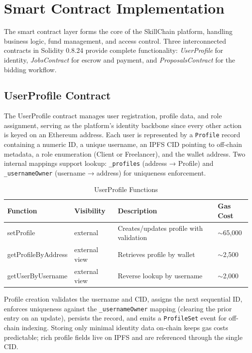 \section{Smart Contract Implementation}

The smart contract layer forms the core of the SkillChain platform, handling business logic, fund management, and access control. Three interconnected contracts in Solidity 0.8.24 provide complete functionality: \textit{UserProfile} for identity, \textit{JobsContract} for escrow and payment, and \textit{ProposalsContract} for the bidding workflow.

\subsection{UserProfile Contract}

The UserProfile contract manages user registration, profile data, and role assignment, serving as the platform's identity backbone since every other action is keyed on an Ethereum address. Each user is represented by a \texttt{Profile} record containing a numeric ID, a unique username, an IPFS CID pointing to off-chain metadata, a role enumeration (Client or Freelancer), and the wallet address. Two internal mappings support lookup: \texttt{\_profiles} (address → Profile) and \texttt{\_usernameOwner} (username → address) for uniqueness enforcement.

\begin{table}[H]
\centering
\caption{UserProfile Functions}
\begin{tabular}{|p{4cm}|p{2.5cm}|p{4cm}|p{2cm}|}
\hline
\textbf{Function} & \textbf{Visibility} & \textbf{Description} & \textbf{Gas Cost} \\
\hline
setProfile & external & Creates/updates profile with validation & $\sim$65,000 \\
\hline
getProfileByAddress & external view & Retrieves profile by wallet & $\sim$2,500 \\
\hline
getUserByUsername & external view & Reverse lookup by username & $\sim$2,000 \\
\hline
\end{tabular}
\end{table}

Profile creation validates the username and CID, assigns the next sequential ID, enforces uniqueness against the \texttt{\_usernameOwner} mapping (clearing the prior entry on an update), persists the record, and emits a \texttt{ProfileSet} event for off-chain indexing. Storing only minimal identity data on-chain keeps gas costs predictable; rich profile fields live on IPFS and are referenced through the single CID.


